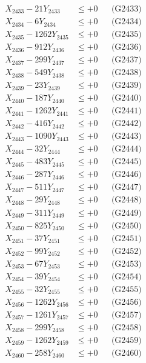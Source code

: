 \documentclass[a4paper,10pt]{article}
\begin{document}
{\begin{align}
X_{2433} - 21Y_{2433} &\leq +0 && \text{(G2433)} \\
X_{2434} - 6Y_{2434} &\leq +0 && \text{(G2434)} \\
X_{2435} - 1262Y_{2435} &\leq +0 && \text{(G2435)} \\
X_{2436} - 912Y_{2436} &\leq +0 && \text{(G2436)} \\
X_{2437} - 299Y_{2437} &\leq +0 && \text{(G2437)} \\
X_{2438} - 549Y_{2438} &\leq +0 && \text{(G2438)} \\
X_{2439} - 23Y_{2439} &\leq +0 && \text{(G2439)} \\
X_{2440} - 187Y_{2440} &\leq +0 && \text{(G2440)} \\
\allowbreak
X_{2441} - 1262Y_{2441} &\leq +0 && \text{(G2441)} \\
X_{2442} - 416Y_{2442} &\leq +0 && \text{(G2442)} \\
X_{2443} - 1090Y_{2443} &\leq +0 && \text{(G2443)} \\
X_{2444} - 32Y_{2444} &\leq +0 && \text{(G2444)} \\
X_{2445} - 483Y_{2445} &\leq +0 && \text{(G2445)} \\
X_{2446} - 287Y_{2446} &\leq +0 && \text{(G2446)} \\
X_{2447} - 511Y_{2447} &\leq +0 && \text{(G2447)} \\
X_{2448} - 29Y_{2448} &\leq +0 && \text{(G2448)} \\
X_{2449} - 311Y_{2449} &\leq +0 && \text{(G2449)} \\
X_{2450} - 825Y_{2450} &\leq +0 && \text{(G2450)} \\
\allowbreak
X_{2451} - 37Y_{2451} &\leq +0 && \text{(G2451)} \\
X_{2452} - 99Y_{2452} &\leq +0 && \text{(G2452)} \\
X_{2453} - 67Y_{2453} &\leq +0 && \text{(G2453)} \\
X_{2454} - 39Y_{2454} &\leq +0 && \text{(G2454)} \\
X_{2455} - 32Y_{2455} &\leq +0 && \text{(G2455)} \\
X_{2456} - 1262Y_{2456} &\leq +0 && \text{(G2456)} \\
X_{2457} - 1261Y_{2457} &\leq +0 && \text{(G2457)} \\
X_{2458} - 299Y_{2458} &\leq +0 && \text{(G2458)} \\
X_{2459} - 1262Y_{2459} &\leq +0 && \text{(G2459)} \\
X_{2460} - 258Y_{2460} &\leq +0 && \text{(G2460)} \\

\end{align}}
\end{document}
